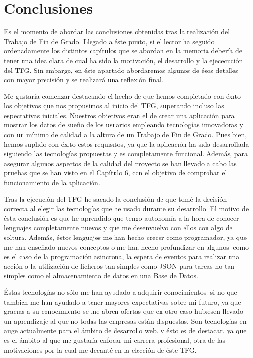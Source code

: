 \documentclass[11pt,openany]{book}
\begin{document}
\chapter{Conclusiones}

Es el momento de abordar las conclusiones obtenidas tras la realización del Trabajo de Fin de Grado. Llegado a éste punto, si el lector ha seguido ordenadamente los distintos capítulos que se abordan en la memoria debería de tener una idea clara de cual ha sido la motivación, el desarrollo y la ejececución del TFG. Sin embargo, en éste apartado abordaremos algunos de ésos detalles con mayor precisión y se realizará una reflexión final.

Me gustaría comenzar destacando el hecho de que hemos completado con éxito los objetivos que nos propusimos al inicio del TFG, superando incluso las espectativas iniciales. Nuestros objetivos eran el de crear una aplicación para mostrar los datos de sueño de los usuarios empleando tecnologías innovadoras y con un mínimo de calidad a la altura de un Trabajo de Fin de Grado. Pues bien, hemos suplido con éxito estos requisitos, ya que la aplicación ha sido desarrollada siguiendo las tecnologías propuestas y es completamente funcional. Además, para asegurar algunos aspectos de la calidad del proyecto se han llevado a cabo las pruebas que se han visto en el Capítulo 6, con el objetivo de comprobar el funcionamiento de la aplicación.

Tras la ejecución del TFG he sacado la conclusión de que tomé la decisión correcta al elegir las tecnologías que he usado durante su desarrollo. El motivo de ésta conclusión es que he aprendido que tengo autonomía a la hora de conocer lenguajes completamente nuevos y que me desenvuelvo con ellos con algo de soltura. Además, éstos lenguajes me han hecho crecer como programador, ya que me han enseñado nuevos conceptos o me han hecho profundizar en algunos, como es el caso de la programación asincrona, la espera de eventos para realizar una acción o la utilización de ficheros tan simples como JSON para tareas no tan simples como el almacenamiento de datos en una Base de Datos.

Éstas tecnologías no sólo me han ayudado a adquirir conocimientos, si no que también me han ayudado a tener mayores expectativas sobre mi futuro, ya que gracias a su conocimiento se me abren ofertas que en otro caso hubiesen llevado un aprendizaje al que no todas las empresas están dispuestas. Son tecnologías en auge actualmente para el ámbito de desarrollo web, y ésto es de destacar, ya que es el ámbito al que me gustaría enfocar mi carrera profesional, otra de las motivaciones por la cual me decanté en la elección de éste TFG.
\end{document}
